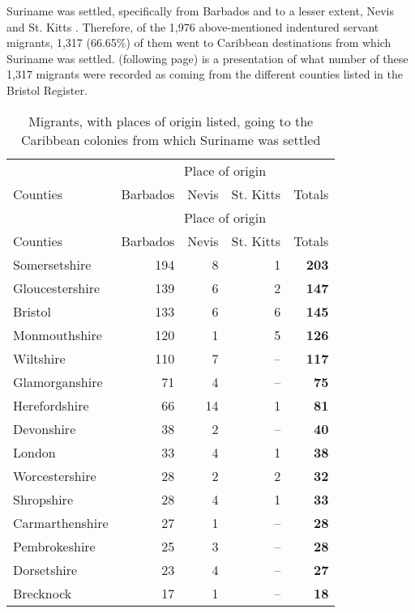 Suriname was settled, specifically from Barbados and to a lesser extent, Nevis and St. Kitts \citep{Sainsbury60, Kambel99, Whitehead96}. Therefore, of the 1,976 above-mentioned indentured servant migrants, 1,317 (66.65\%) of them went to Caribbean destinations from which Suriname was settled.  (following page) is a presentation of what number of these 1,317 migrants were recorded as coming from the different counties listed in the Bristol Register.

\begin{longtable}{lrrrr}
\caption{Migrants, with places of origin listed, going to the Caribbean colonies from which Suriname was settled \label{1}}\\
\lsptoprule
         & \multicolumn{4}{c}{Place of origin}\\\cmidrule(lr){2-5}
Counties & \multicolumn{1}{c}{Barbados} & \multicolumn{1}{c}{Nevis} & \multicolumn{1}{c}{St. Kitts} & \multicolumn{1}{c}{Totals}\\
\midrule
\endfirsthead
\midrule
         & \multicolumn{4}{c}{Place of origin}\\\cmidrule(lr){2-5}
Counties & \multicolumn{1}{c}{Barbados} & \multicolumn{1}{c}{Nevis} & \multicolumn{1}{c}{St. Kitts} & \multicolumn{1}{c}{Totals}\\\midrule\endhead
\lspbottomrule\endlastfoot
Somersetshire & 194 & 8 & 1 & \textbf{203}\\
Gloucestershire & 139 & 6 & 2 & \textbf{147}\\
Bristol & 133 & 6 & 6 & \textbf{145}\\
Monmouthshire & 120 & 1 & 5 & \textbf{126}\\
Wiltshire & 110 & 7 & -- & \textbf{117}\\
Glamorganshire & 71 & 4 & -- & \textbf{75}\\
Herefordshire & 66 & 14 & 1 & \textbf{81}\\
Devonshire & 38 & 2 & -- & \textbf{40}\\
London & 33 & 4 & 1 & \textbf{38}\\
Worcestershire & 28 & 2 & 2 & \textbf{32}\\
Shropshire & 28 & 4 & 1 & \textbf{33}\\
Carmarthenshire & 27 & 1 & -- & \textbf{28}\\
Pembrokeshire & 25 & 3 & -- & \textbf{28}\\
Dorsetshire & 23 & 4 & -- & \textbf{27}\\
Brecknock &17 & 1 & -- & \textbf{18}\\

\end{longtable}
